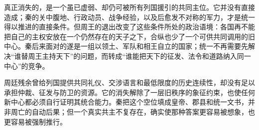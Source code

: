 真正消失的，是一个虽已虚弱、却仍可被所有列国援引的共同主位。它并没有直接造成；秦的关中腹地、行政动员、战争经验，以及后愈发不对称的军力，才是统一得以推进的直接条件。但周王的退出改变了这些条件所处的政治语境：各国再不能把自己的主权安放在一个仍然存在的天子之下，合纵也少了一个可供共同调用的旧中心。秦后来面对的遂是一组以领土、军队和相王自立的国家；统一不再需要先解决“谁替周王主持天下”的问题，而转成“谁能把天下的征发、法令和道路纳入同一中心”的竞争。

\begin{turningpoint}
周廷残余曾给列国提供共同礼仪、交涉语言和最低限度的历史连续性，却没有足以承担仲裁、征发与防卫的资源。它的消失解除了一层旧秩序的象征约束，也使任何新中心都必须自行证明其统合能力。秦把这个空位填成皇帝、郡县和统一文书，并非周亡的自动后果；但一个真实共主不复存在，确实使那种答案更容易被想象，也更容易被强制推行。
\end{turningpoint}
